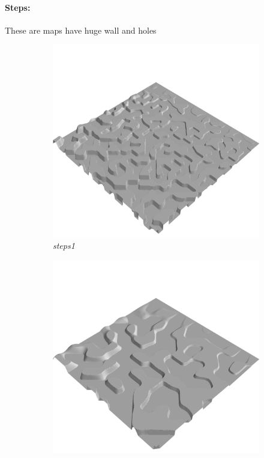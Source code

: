 \documentclass[../document.tex]{subfiles}
\begin{document}
\paragraph{Steps:} These are maps have huge wall and holes
\begin{figure}[H]
    \centering
        \begin{subfigure}[b]{0.32\textwidth}
            \includegraphics[width=\textwidth]{../img/hm3d/steps1.png}
            \caption{\emph{steps1}}
        \end{subfigure}
        \begin{subfigure}[b]{0.32\linewidth}
            \includegraphics[width=\textwidth]{../img/hm3d/steps2.png}

\end{subfigure}
\end{figure}
\end{document}
